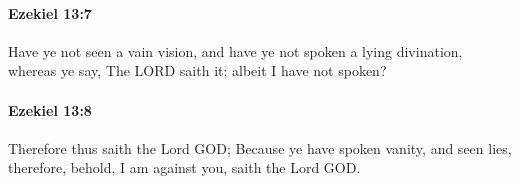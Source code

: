 		\paragraph{Ezekiel 13:7} %
			\label{EZEKIEL-13-7}

			Have ye not seen a vain vision, and have ye not spoken a lying divination, whereas ye say, The LORD saith it; albeit I have not spoken?


		\paragraph{Ezekiel 13:8} %
			\label{EZEKIEL-13-8}

			Therefore thus saith the Lord GOD; Because ye have spoken vanity, and seen lies, therefore, behold, I am against you, saith the Lord GOD.



